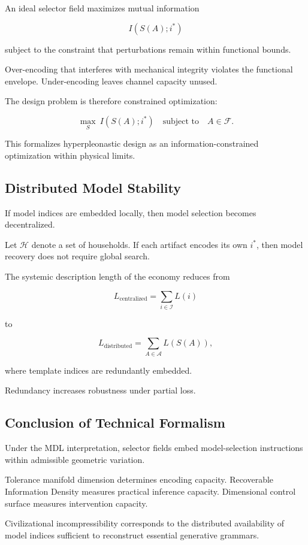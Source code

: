 \documentclass[11pt]{article}
\begin{document}
An ideal selector field maximizes mutual information

\[
I(S(A); i^*)
\]

subject to the constraint that perturbations remain within
functional bounds.

Over-encoding that interferes with mechanical integrity
violates the functional envelope.
Under-encoding leaves channel capacity unused.

The design problem is therefore constrained optimization:

\[
\max_{S} \ I(S(A); i^*)
\quad
\text{subject to}
\quad
A \in \mathcal{F}.
\]

This formalizes hyperpleonastic design as
an information-constrained optimization within physical limits.

\subsection{Distributed Model Stability}

If model indices are embedded locally,
then model selection becomes decentralized.

Let $\mathcal{H}$ denote a set of households.
If each artifact encodes its own $i^*$,
then model recovery does not require global search.

The systemic description length of the economy reduces from

\[
L_{\text{centralized}} = \sum_{i \in \mathcal{I}} L(i)
\]

to

\[
L_{\text{distributed}} = \sum_{A \in \mathcal{A}} L(S(A)),
\]

where template indices are redundantly embedded.

Redundancy increases robustness under partial loss.

\subsection{Conclusion of Technical Formalism}

Under the MDL interpretation, selector fields embed
model-selection instructions within admissible geometric variation.

Tolerance manifold dimension determines encoding capacity.
Recoverable Information Density measures practical inference capacity.
Dimensional control surface measures intervention capacity.

Civilizational incompressibility corresponds to the
distributed availability of model indices sufficient
to reconstruct essential generative grammars.
\end{document}
